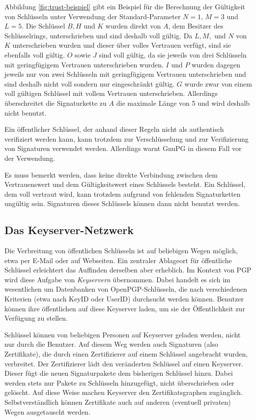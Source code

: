 Abbildung \ref{fig:trust-beispiel} gibt ein Beispiel für die
Berechnung der Gültigkeit von Schlüsseln unter Verwendung der
Standard-Parameter $N=1$, $M=3$ und $L=5$. Die Schlüssel $B, H$ und
$K$ wurden direkt von $A$, dem Besitzer des Schlüsselrings,
unterschrieben und sind deshalb voll gültig. Da $L, M,$ und $N$ von
$K$ unterschrieben wurden und dieser über volles Vertrauen verfügt,
sind sie ebenfalls voll gültig. $O$ sowie $J$ sind voll gültig, da sie
jeweils von drei Schlüsseln mit geringfügigem Vertrauen unterschrieben
wurden. $I$ und $P$ wurden dagegen jeweils nur von zwei Schlüsseln mit
geringfügigem Vertrauen unterschrieben und sind deshalb nicht voll
sondern nur eingeschränkt gültig. $G$ wurde zwar von einem voll
gültigen Schlüssel mit vollem Vertrauen unterschrieben. Allerdings
überschreitet die Signaturkette zu $A$ die maximale Länge von 5 und
wird deshalb nicht benutzt.

Ein öffentlicher Schlüssel, der anhand dieser Regeln nicht als
authentisch verifiziert werden kann, kann trotzdem zur Verschlüsselung
und zur Verifizierung von Signaturen verwendet werden. Allerdings
warnt GnuPG in diesem Fall vor der Verwendung.

Es muss bemerkt werden, dass keine direkte Verbindung zwischen dem
Vertrauenswert und dem Gültigkeitswert eines Schlüssels
besteht. Ein Schlüssel, dem voll vertraut wird, kann trotzdem
aufgrund von fehlenden Signaturketten ungültig sein. Signaturen
dieses Schlüssels können dann nicht benutzt werden.

\subsection{Das Keyserver-Netzwerk}
\label{sec:das-keys-netzw}

Die Verbreitung von öffentlichen Schlüsseln ist auf beliebigen
Wegen möglich, etwa per E-Mail oder auf Webseiten. Ein zentraler
Ablageort für öffentliche Schlüssel erleichtert das Auffinden
derselben aber erheblich. Im Kontext von PGP wird diese Aufgabe von
\emph{Keyservern} übernommen. Dabei handelt es sich im wesentlichen
um Datenbanken von OpenPGP-Schlüsseln, die nach verschiedenen
Kriterien (etwa nach KeyID oder UserID) durchsucht werden
können. Benutzer können ihre öffentlichen auf diese Keyserver
laden, um sie der Öffentlichkeit zur Verfügung zu stellen.

Schlüssel können von beliebigen Personen auf Keyserver geladen
werden, nicht nur durch die Benutzer. Auf diesem Weg werden auch
Signaturen (also Zertifikate), die durch einen Zertifizierer auf einem
Schlüssel angebracht wurden, verbreitet. Der Zertifizierer lädt
den veränderten Schlüssel auf einen Keyserver. Dieser fügt die
neuen Signaturpakete dem bisherigen Schlüssel hinzu. Dabei werden
stets nur Pakete zu Schlüsseln hinzugefügt, nicht überschrieben
oder gelöscht. Auf diese Weise machen Keyserver den
Zertifikatsgraphen zugänglich. Selbstverständlich können
Zertifikate auch auf anderen (eventuell privaten) Wegen ausgetauscht
werden.

